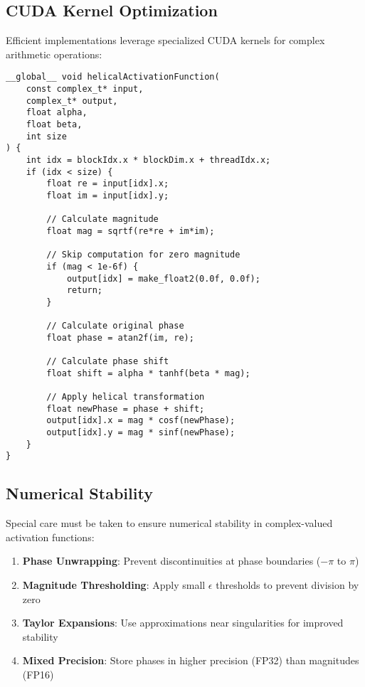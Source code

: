 \subsection{CUDA Kernel Optimization}

Efficient implementations leverage specialized CUDA kernels for complex arithmetic operations:

\begin{tcolorbox}[colback=CodeBackground, colframe=DarkGray, title=Optimized CUDA Implementation of HAF, fonttitle=\bfseries]
\begin{verbatim}
__global__ void helicalActivationFunction(
    const complex_t* input,
    complex_t* output,
    float alpha,
    float beta,
    int size
) {
    int idx = blockIdx.x * blockDim.x + threadIdx.x;
    if (idx < size) {
        float re = input[idx].x;
        float im = input[idx].y;
        
        // Calculate magnitude
        float mag = sqrtf(re*re + im*im);
        
        // Skip computation for zero magnitude
        if (mag < 1e-6f) {
            output[idx] = make_float2(0.0f, 0.0f);
            return;
        }
        
        // Calculate original phase
        float phase = atan2f(im, re);
        
        // Calculate phase shift
        float shift = alpha * tanhf(beta * mag);
        
        // Apply helical transformation
        float newPhase = phase + shift;
        output[idx].x = mag * cosf(newPhase);
        output[idx].y = mag * sinf(newPhase);
    }
}
\end{verbatim}
\end{tcolorbox}

\subsection{Numerical Stability}

Special care must be taken to ensure numerical stability in complex-valued activation functions:

\begin{enumerate}
    \item \textbf{Phase Unwrapping}: Prevent discontinuities at phase boundaries ($-\pi$ to $\pi$)
    \item \textbf{Magnitude Thresholding}: Apply small $\epsilon$ thresholds to prevent division by zero
    \item \textbf{Taylor Expansions}: Use approximations near singularities for improved stability
    \item \textbf{Mixed Precision}: Store phases in higher precision (FP32) than magnitudes (FP16)
\end{enumerate}

